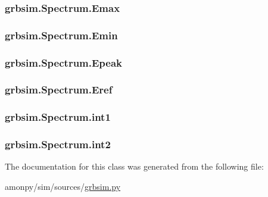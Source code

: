 \hypertarget{classgrbsim_1_1_spectrum_a4c52b101a6634e432f765208fefbd9a4}{
\subsubsection[{Emax}]{\setlength{\rightskip}{0pt plus 5cm}grbsim.\-Spectrum.\-Emax}}\label{classgrbsim_1_1_spectrum_a4c52b101a6634e432f765208fefbd9a4}
\hypertarget{classgrbsim_1_1_spectrum_a8ac0b75b32e04abda6c277b2b397106f}{
\subsubsection[{Emin}]{\setlength{\rightskip}{0pt plus 5cm}grbsim.\-Spectrum.\-Emin}}\label{classgrbsim_1_1_spectrum_a8ac0b75b32e04abda6c277b2b397106f}
\hypertarget{classgrbsim_1_1_spectrum_aac7eb09edb7bccef0e1121c3eb4f71c4}{
\subsubsection[{Epeak}]{\setlength{\rightskip}{0pt plus 5cm}grbsim.\-Spectrum.\-Epeak}}\label{classgrbsim_1_1_spectrum_aac7eb09edb7bccef0e1121c3eb4f71c4}
\hypertarget{classgrbsim_1_1_spectrum_a260c3c6b38ee0881d09c7d2f9fb75fa1}{
\subsubsection[{Eref}]{\setlength{\rightskip}{0pt plus 5cm}grbsim.\-Spectrum.\-Eref}}\label{classgrbsim_1_1_spectrum_a260c3c6b38ee0881d09c7d2f9fb75fa1}
\hypertarget{classgrbsim_1_1_spectrum_aec39bd12a4d93afc29ce1c7126326ded}{
\subsubsection[{int1}]{\setlength{\rightskip}{0pt plus 5cm}grbsim.\-Spectrum.\-int1}}\label{classgrbsim_1_1_spectrum_aec39bd12a4d93afc29ce1c7126326ded}
\hypertarget{classgrbsim_1_1_spectrum_aa1856fabc3f7956b95a3ecddbd4af6e4}{
\subsubsection[{int2}]{\setlength{\rightskip}{0pt plus 5cm}grbsim.\-Spectrum.\-int2}}\label{classgrbsim_1_1_spectrum_aa1856fabc3f7956b95a3ecddbd4af6e4}


The documentation for this class was generated from the following file\-:\begin{DoxyCompactItemize}
\item 
amonpy/sim/sources/\hyperlink{grbsim_8py}{grbsim.\-py}\end{DoxyCompactItemize}
